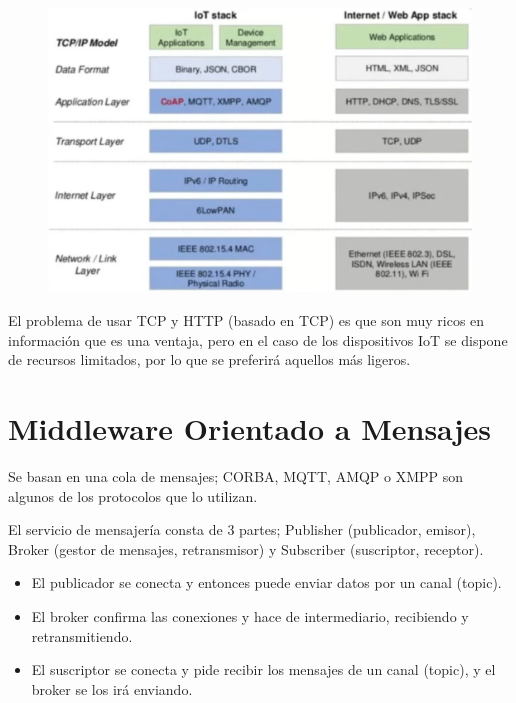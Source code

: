 \documentclass[12pt]{report} %
\begin{document}
\begin{figure}[H]
	{\includegraphics[scale=.5]{2021-04-08 09_06_45-2021-04-07 17-01-12.mkv.png}}
\end{figure}

El problema de usar TCP y HTTP (basado en TCP) es que son muy ricos en información que es una ventaja, pero en el caso de los dispositivos IoT se dispone de recursos limitados, por lo que se preferirá aquellos más ligeros.

\section{Middleware Orientado a Mensajes}

Se basan en una cola de mensajes; CORBA, MQTT, AMQP o XMPP son algunos de los protocolos que lo utilizan.

El servicio de mensajería consta de 3 partes; Publisher (publicador, emisor), Broker (gestor de mensajes, retransmisor) y Subscriber (suscriptor, receptor).
\begin{itemize}
	\item El publicador se conecta y entonces puede enviar datos por un canal (topic).
	\item El broker confirma las conexiones y hace de intermediario, recibiendo y retransmitiendo.
	\item El suscriptor se conecta y pide recibir los mensajes de un canal (topic), y el broker se los irá enviando.
\end{itemize}
\end{document}
